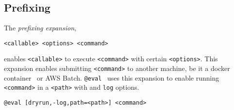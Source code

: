 \subsection{Prefixing}
\label{prefixing}

The \emph{prefixing expansion},
%
\begin{verbatim}
<callable> <options> <command>
\end{verbatim}
%
enables \texttt{<callable>} to execute \texttt{<command>} with certain \texttt{<options>}. This expansion enables submitting \texttt{<command>} to another machine, be it a docker container~ or AWS Batch. \texttt{@eval}~ uses this expansion to enable running \texttt{<command>} in a \texttt{<path>} with  and \texttt{log} options.
%
\begin{verbatim}
@eval [dryrun,-log,path=<path>] <command>
\end{verbatim}